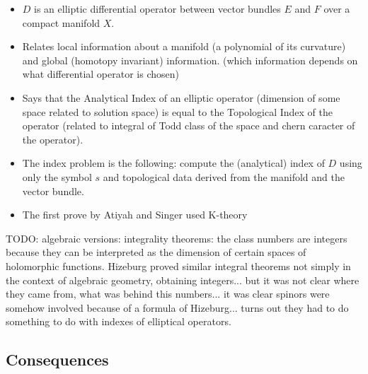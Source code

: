 \documentclass{article}
\begin{document}
\begin{itemize}
    
    \item $D$ is an elliptic differential operator between vector bundles $E$ and $F$ over a compact manifold $X$.
    
    \item Relates local information about a manifold (a polynomial of its curvature) and global (homotopy invariant) information. (which information depends on what differential operator is chosen)
    
    \item Says that the Analytical Index of an elliptic operator (dimension of some space related to solution space) is equal to the Topological Index of the operator (related to integral of Todd class of the space and chern caracter of the operator).
    
    \item The index problem is the following: compute the (analytical) index of $D$ using only the symbol $s$ and topological data derived from the manifold and the vector bundle.
    
    \item The first prove by Atiyah and Singer used K-theory
\end{itemize}




TODO: algebraic versions: integrality theorems: the class numbers are integers because they can be interpreted as the dimension of certain spaces of holomorphic functions. Hizeburg proved similar integral theorems not simply in the context of algebraic geometry, obtaining integers... but it was not clear where they came from, what was behind this numbers... it was clear spinors were somehow involved because of a formula of Hizeburg... turns out they had to do something to do with indexes of elliptical operators.

\subsection{Consequences}
\end{document}
